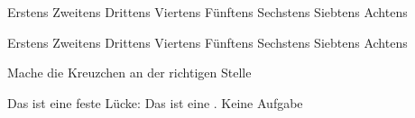 \documentclass[a4paper,12pt]{scrartcl}
\begin{document}

    \begin{aufgabe}[points=3,subtitle=Eine Kreuzchenaufgabe]
        \begin{mcumgebung} %
            \choice Erstens
            \choice Zweitens
            \choice Drittens
            \choice[\mcrichtig] Viertens
            \choice Fünftens
            \choice[\mcrichtig] Sechstens
            \choice Siebtens
            \choice[\mcrichtig] Achtens
        \end{mcumgebung}
        \begin{loesung}
                \begin{mcumgebung} %
                \choice Erstens
                \choice Zweitens
                \choice Drittens
                \choice[\mcrichtig] Viertens
                \choice Fünftens
                \choice[\mcrichtig] Sechstens
                \choice Siebtens
                \choice[\mcrichtig] Achtens
            \end{mcumgebung}
        \end{loesung}
        \begin{bearbeitungshinweis}
            Mache die Kreuzchen an der richtigen Stelle
        \end{bearbeitungshinweis}
    \end{aufgabe}


    \begin{aufgabe}[symbol=\symBleistift]
        \begin{teilaufgaben}
            \teilaufgabe[2] Das ist eine feste Lücke: \luecke[style={\uwave{#1}}]{2cm}
            \teilaufgabe[3] Das ist eine .
            \teilaufgabe[20] Keine Aufgabe
        \end{teilaufgaben}
    \end{aufgabe}
\end{document}
